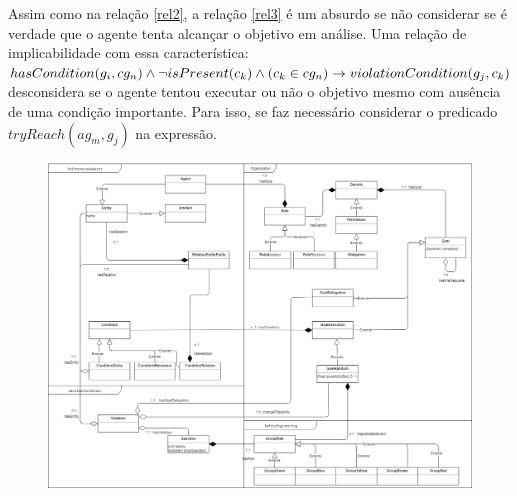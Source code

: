 \documentclass[12pt]{article}
\begin{document}
Assim como na relação \ref{rel2}, a relação \ref{rel3} é um absurdo se não considerar se é verdade que o agente tenta alcançar o objetivo em análise. Uma relação de implicabilidade com essa característica: $hasCondition(g_i,cg_n) \wedge \neg isPresent(c_k) \wedge (c_k \in cg_n) \to \\ violationCondition(g_j,c_k) $  desconsidera se o agente tentou executar ou não o objetivo mesmo com ausência de uma condição importante. Para isso, se faz necessário considerar o predicado $tryReach(ag_m,g_j)$ na expressão.

\begin{figure}
  \centering
  \includegraphics[width=0.8\linewidth]{umlmodel} 
\end{figure}
\end{document}
